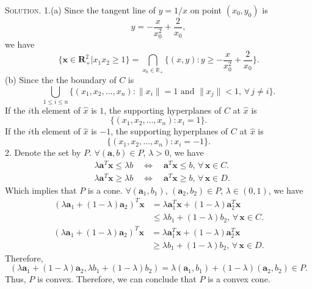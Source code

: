 \documentclass[12pt, a4paper, oneside]{ctexart}
\newenvironment{solution}{\par\noindent\textsc{Solution. }}{\\\par}
\begin{document}
\begin{solution}
	1.(a) Since the tangent line of $y = 1/x$ on point $(x_0, y_0)$ is
	\[
	y = -\frac{x}{x_0^2} + \frac{2}{x_0},
	\]
	we have
	\[
	\{\mathbf{x} \in \mathbf{R}_+^2| x_1x_2 \geq 1\} = \bigcap\limits_{x_0 \in \mathbb{R}_+}\{(x, y): y \geq -\frac{x}{x_0^2} + \frac{2}{x_0}\}.
	\]
	\newline
	(b) Since the the boundary of $C$ is 
	\[
	\bigcup\limits_{1 \leq i \leq n} \{(x_1, x_2, \dots, x_n): \|x_i\| = 1 \text{ and } \|x_j\| < 1,\, \forall\, j \neq i\}.
	\]
	If the $i$th element of $\hat{x}$ is $1$, the supporting hyperplanes of $C$ at $\hat{x}$ is
	\[
	\{(x_1, x_2, \dots, x_n): x_i = 1\}.
	\]
	If the $i$th element of $\hat{x}$ is $-1$, the supporting hyperplanes of $C$ at $\hat{x}$ is
	\[
	\{(x_1, x_2, \dots, x_n): x_i = -1\}.
	\]
	2. Denote the set by $P$.
	\newline
	$\forall (\mathbf{a}, b) \in P$, $\lambda > 0$, we have
	\begin{align*}
		& \lambda \mathbf{a}^T \mathbf{x} \leq \lambda b \quad \Leftrightarrow \quad \mathbf{a}^T \mathbf{x} \leq b,\, \forall\, \mathbf{x} \in C. \\
		& \lambda \mathbf{a}^T \mathbf{x} \geq \lambda b \quad \Leftrightarrow \quad \mathbf{a}^T \mathbf{x} \geq b,\, \forall\, \mathbf{x} \in D. 
	\end{align*}
	Which implies that $P$ is a cone.
	\newline
	$\forall (\mathbf{a}_1, b_1)$, $(\mathbf{a}_2, b_2) \in P$, $\lambda \in (0, 1)$, we have
	\begin{align*}
		(\lambda \mathbf{a}_1 + (1 - \lambda) \mathbf{a}_2)^T \mathbf{x} 
		& = \lambda \mathbf{a}_1^T \mathbf{x} + (1 - \lambda) \mathbf{a}_2^T \mathbf{x} \\
		& \leq \lambda b_1 + (1 - \lambda) b_2,\, \forall\, \mathbf{x} \in C.
	\end{align*}
	\begin{align*}
		(\lambda \mathbf{a}_1 + (1 - \lambda) \mathbf{a}_2)^T \mathbf{x} 
		& = \lambda \mathbf{a}_1^T \mathbf{x} + (1 - \lambda) \mathbf{a}_2^T \mathbf{x} \\
		& \geq \lambda b_1 + (1 - \lambda) b_2,\, \forall\, \mathbf{x} \in D.
	\end{align*}
	Therefore, 
	\[
	(\lambda \mathbf{a}_1 + (1 - \lambda) \mathbf{a}_2, \lambda b_1 + (1 - \lambda) b_2) = \lambda (\mathbf{a}_1, b_1) + (1 - \lambda)(\mathbf{a}_2, b_2) \in P.
	\]
	Thus, $P$ is convex. Therefore, we can conclude that $P$ is a convex cone.
\end{solution}
\end{document}
